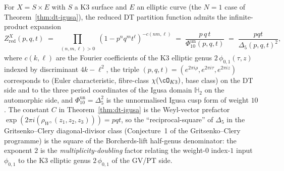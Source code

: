 \begin{theorem}[KKV \texorpdfstring{$=$}{=} GV \texorpdfstring{$=$}{=} PT identification of the Oberdieck--Pandharipande denominator]
\label{thm:op-kkv-gv-pt-identification}
For $X = S \times E$ with $S$ a K3 surface and $E$ an elliptic curve
(the $N = 1$ case of Theorem~\ref{thm:dt-igusa}), the reduced DT
partition function admits the infinite-product expansion
\[
 Z^X_{\mathrm{red}}(p, q, t)
 \;=\;
 \prod_{\substack{(n,m,\ell) > 0}} (1 - p^n q^m t^\ell)^{-c(nm,\ell)}
 \;=\;
 \frac{p\,q\,t}{\Phi_{10}^{\mathrm{un}}(p,q,t)}
 \;=\;
 \frac{pqt}{\Delta_5(p,q,t)^2},
\]
where $c(k, \ell)$ are the Fourier coefficients of the K3 elliptic
genus $2\,\phi_{0,1}(\tau, z)$ indexed by discriminant $4k - \ell^2$,
the triple $(p, q, t) = (e^{2\pi i \rho}, e^{2\pi i \tau}, e^{2\pi i z})$
corresponds to (Euler characteristic, fibre-class $\chi(\cO_{K3})$, base
class) on the DT side and to the three period coordinates of the
	Igusa domain $\mathbb{H}_2$ on the automorphic side, and
\(\Phi_{10}^{\mathrm{un}}=\Delta_5^2\) is the unnormalised Igusa cusp
form of weight $10$. The
constant $C$ in Theorem~\ref{thm:dt-igusa} is the Weyl-vector prefactor
$\exp(2\pi i (\rho_W, (z_1, z_2, z_3))) = pqt$, so the ``reciprocal-square''
of $\Delta_5$ in the Gritsenko--Clery diagonal-divisor class
(Conjecture~1 of the Gritsenko--Clery programme) is the square of the
Borcherds-lift half-genus denominator: the exponent $2$ is the
\emph{multiplicity-doubling} factor relating the weight-$0$ index-$1$
input $\phi_{0,1}$ to the K3 elliptic genus $2\,\phi_{0,1}$ of the
GV/PT side.
\end{theorem}

